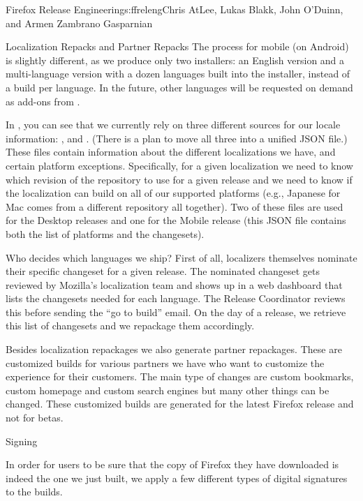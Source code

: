 \begin{aosachapter}{Firefox Release Engineering}{s:ffreleng}{Chris AtLee, Lukas Blakk, John O'Duinn, and Armen Zambrano Gasparnian}
\begin{aosasect1}{Localization Repacks and Partner Repacks}
The process for mobile (on Android) is slightly different, as we produce
only two installers: an English version and a multi-language version
with a dozen languages built into the installer, instead of a
build per language. In the future, other languages will be requested
on demand as add-ons from .

In , you can see that we currently rely
on three different sources for our locale information:
,  and
. (There is a plan to move
all three into a unified JSON file.) These files contain information
about the different localizations we have, and certain platform
exceptions. Specifically, for a given localization we need to know
which revision of the repository to use for a given release and we
need to know if the localization can build on all of our supported
platforms (e.g.,  Japanese for Mac comes from a different repository all
together).  Two of these files are used for the Desktop releases and
one for the Mobile release (this JSON file contains both the list of
platforms and the changesets).

Who decides which languages we ship? First of all, localizers
themselves nominate their specific changeset for a given release. The
nominated changeset gets reviewed by Mozilla's localization team and
shows up in a web dashboard that lists the changesets needed for each
language. The Release Coordinator reviews this before sending the ``go
to build'' email. On the day of a release, we retrieve this list of
changesets and we repackage them accordingly.

Besides localization repackages we also generate partner
repackages. These are customized builds for various partners we have
who want to customize the experience for their customers.  The main
type of changes are custom bookmarks, custom homepage and custom
search engines but many other things can be changed. These customized
builds are generated for the latest Firefox release and not for betas.

\end{aosasect1}

\begin{aosasect1}{Signing}

In order for users to be sure that the copy of Firefox they have
downloaded is indeed the one we just built, we apply a few different
types of digital signatures to the builds.


\end{aosasect1}
\end{aosachapter}
